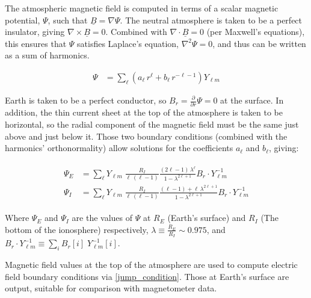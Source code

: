 \documentclass[draft,linenumbers]{agujournal}
\begin{document}
The atmospheric magnetic field is computed in terms of a scalar magnetic potential, $\Psi$, such that $\underline{B}=\nabla \Psi$. The neutral atmosphere is taken to be a perfect insulator, giving $\nabla \times \underline{B}=0$. Combined with $\nabla \cdot \underline{B}=0$ (per Maxwell's equations), this ensures that $\Psi$ satisfies Laplace's equation, $\nabla^2 \Psi = 0$, and thus can be written as a sum of harmonics\citep{jackson_1999}.
\begin{linenomath*}
\begin{align}
  \label{psi_expansion}
  \Psi &= \displaystyle\sum_\ell \left( a_\ell \, r^\ell +
    b_\ell \, r^{-\ell - 1} \right) Y_{\ell m}
\end{align}
\end{linenomath*}

Earth is taken to be a perfect conductor, so $B_r = \frac{\partial}{\partial r} \Psi = 0$ at the surface. In addition, the thin current sheet at the top of the atmosphere is taken to be horizontal, so the radial component of the magnetic field must be the same just above and just below it. Those two boundary conditions (combined with the harmonics' orthonormality) allow solutions for the coefficients $a_\ell$ and $b_\ell$, giving:
\begin{linenomath*}
\begin{align}
  \label{psi_final}
  \begin{split}
  \Psi_E &= \displaystyle\sum_\ell Y_{\ell m} \; \frac{R_I}{ \ell \, \left(\ell - 1\right) } \frac{ \left(2 \ell - 1\right) \, \lambda^\ell }{ 1 - \lambda^{2 \ell + 1} } B_r \cdot Y_{\ell m}^{-1} \\
  \Psi_I &= \displaystyle\sum_\ell Y_{\ell m} \; \frac{R_I}{ \ell \, \left(\ell - 1\right) } \frac{ \left(\ell - 1\right) + \ell \, \lambda^{2 \ell + 1} }{ 1 - \lambda^{2 \ell + 1} } B_r \cdot Y_{\ell m}^{-1}
  \end{split}
\end{align}
\end{linenomath*}

Where $\Psi_E$ and $\Psi_I$ are the values of $\Psi$ at $R_E$ (Earth's surface) and $R_I$ (The bottom of the ionosphere) respectively, $\lambda \equiv \frac{R_E}{R_I} \sim \num{0.975}$, and $B_r \cdot Y_{\ell m}^{-1} \equiv \displaystyle\sum_i B_r [i] \; Y_{\ell m}^{-1} \! [i]$.

Magnetic field values at the top of the atmosphere are used to compute electric field boundary conditions via \cref{jump_condition}. Those at Earth's surface are output, suitable for comparison with magnetometer data.
\end{document}
